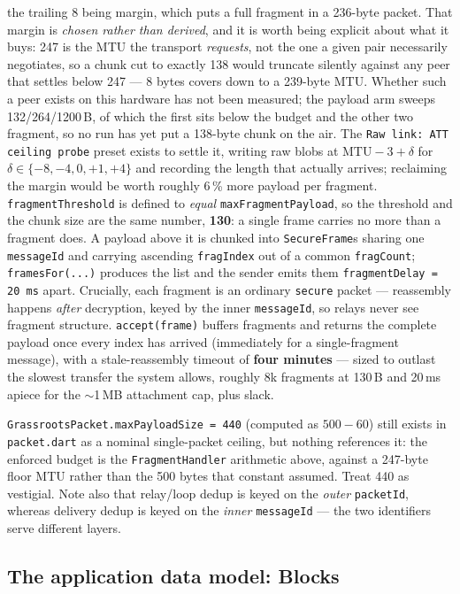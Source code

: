 \documentclass[11pt]{report}
\newcommand{\code}[1]{\texttt{\small #1}}
\begin{document}
the trailing 8 being margin, which puts a full fragment in a 236-byte packet. That margin is \emph{chosen rather than derived}, and it is worth being explicit about what it buys: 247 is the MTU the transport \emph{requests}, not the one a given pair necessarily negotiates, so a chunk cut to exactly 138 would truncate silently against any peer that settles below 247 --- 8 bytes covers down to a 239-byte MTU. Whether such a peer exists on this hardware has not been measured; the payload arm sweeps 132/264/1200\,B, of which the first sits below the budget and the other two fragment, so no run has yet put a 138-byte chunk on the air. The \code{Raw link: ATT ceiling probe} preset exists to settle it, writing raw blobs at $\text{MTU}-3+\delta$ for $\delta \in \{-8,-4,0,+1,+4\}$ and recording the length that actually arrives; reclaiming the margin would be worth roughly 6\,\% more payload per fragment. \code{fragmentThreshold} is defined to \emph{equal} \code{maxFragmentPayload}, so the threshold and the chunk size are the same number, \textbf{130}: a single frame carries no more than a fragment does. A payload above it is chunked into \code{SecureFrame}s sharing one \code{messageId} and carrying ascending \code{fragIndex} out of a common \code{fragCount}; \code{framesFor(...)} produces the list and the sender emits them \code{fragmentDelay = 20\,ms} apart. Crucially, each fragment is an ordinary \code{secure} packet — reassembly happens \emph{after} decryption, keyed by the inner \code{messageId}, so relays never see fragment structure. \code{accept(frame)} buffers fragments and returns the complete payload once every index has arrived (immediately for a single-fragment message), with a stale-reassembly timeout of \textbf{four minutes} --- sized to outlast the slowest transfer the system allows, roughly 8k fragments at 130\,B and 20\,ms apiece for the $\sim$1\,MB attachment cap, plus slack.

\code{GrassrootsPacket.maxPayloadSize = 440} (computed as $500-60$) still exists in \code{packet.dart} as a nominal single-packet ceiling, but nothing references it: the enforced budget is the \code{FragmentHandler} arithmetic above, against a 247-byte floor MTU rather than the 500 bytes that constant assumed. Treat 440 as vestigial. Note also that relay/loop dedup is keyed on the \emph{outer} \code{packetId}, whereas delivery dedup is keyed on the \emph{inner} \code{messageId} — the two identifiers serve different layers.

\subsection*{The application data model: Blocks}
\end{document}
